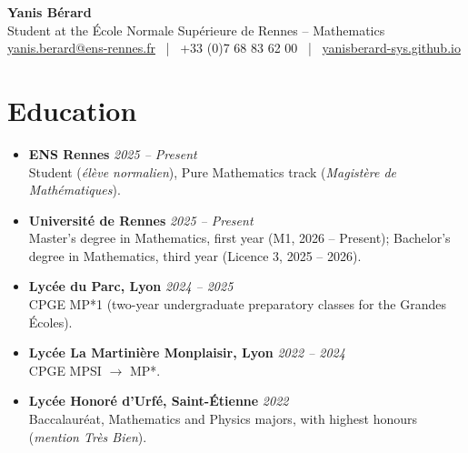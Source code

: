 \documentclass[11pt,a4paper]{article}
\begin{document}
	\pagestyle{empty}
	
	\begin{center}
		{\Huge \textbf{Yanis Bérard}}\\[0.2cm]
		{\Large Student at the École Normale Supérieure de Rennes -- Mathematics}\\[0.2cm]
		\href{mailto:yanis.berard@ens-rennes.fr}{yanis.berard@ens-rennes.fr} ~|~ +33 (0)7 68 83 62 00 ~|~ \href{https://yanisberard-sys.github.io/}{yanisberard-sys.github.io}
	\end{center}
	
	\vspace{0cm}
	
	\section*{Education}
	\begin{itemize}[leftmargin=1em, label={}]
		\item \textbf{ENS Rennes} \hfill \textit{2025 -- Present} \\
		Student (\emph{élève normalien}), Pure Mathematics track (\emph{Magistère de Mathématiques}).
		\vspace{0.02cm}
		
		\item \textbf{Université de Rennes} \hfill \textit{2025 -- Present} \\
		Master's degree in Mathematics, first year (M1, 2026 -- Present); Bachelor's degree in Mathematics, third year (Licence 3, 2025 -- 2026).
		\vspace{0.02cm}
		
		\item \textbf{Lycée du Parc, Lyon} \hfill \textit{2024 -- 2025} \\
		CPGE MP*1 (two-year undergraduate preparatory classes for the Grandes Écoles).
		\vspace{0.02cm}
		
		\item \textbf{Lycée La Martinière Monplaisir, Lyon} \hfill \textit{2022 -- 2024} \\
		CPGE MPSI $\rightarrow$ MP*.
		\vspace{0.02cm}
		
		\item \textbf{Lycée Honoré d'Urfé, Saint-Étienne} \hfill \textit{2022} \\
		Baccalauréat, Mathematics and Physics majors, with highest honours (\emph{mention Très Bien}).
	\end{itemize}
	
\end{document}
